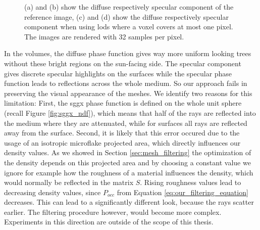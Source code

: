 \begin{figure}[ht]
\begin{subfigure}[b]{0.49\linewidth}
        \caption{}
    \end{subfigure}
    \caption[Diffuse and specular components rendered seperately]{(a) and (b) show the diffuse respectively specular component of the reference image, (c) and (d) show the diffuse respectively specular component when using \acsp{lod} where a voxel covers at most one pixel. The images are rendered with 32 samples per pixel.}
	\label{fig:diffuse_specular_breakdown}
\end{figure}
In the volumes, the diffuse phase function gives way more uniform looking trees without these bright regions on the sun-facing side.
The specular component gives discrete specular highlights on the surfaces while the specular phase function leads to reflections across the whole medium.
So our approach fails in preserving the visual appearance of the meshes.
We identify two reasons for this limitation: First, the \ac{sggx} phase function is defined on the whole unit sphere (recall Figure \ref{fig:sggx_ndf}), which means that half of the rays are reflected into the medium where they are attenuated, while for surfaces all rays are reflected away from the surface.
Second, it is likely that this error occured due to the usage of an isotropic microflake projected area, which directly influences our density values.
As we showed in Section \ref{sec:mesh_filtering} the optimization of the density depends on this projected area and by choosing a constant value we ignore for example how the roughness of a material influences the density, which would normally be reflected in the matrix $S$.
Rising roughness values lead to decreasing density values, since $P_{occ}$ from Equation \ref{eq:our_filtering_equation} decreases.
This can lead to a significantly different look, because the rays scatter earlier.
The filtering procedure however, would become more complex.
Experiments in this direction are outside of the scope of this thesis.


